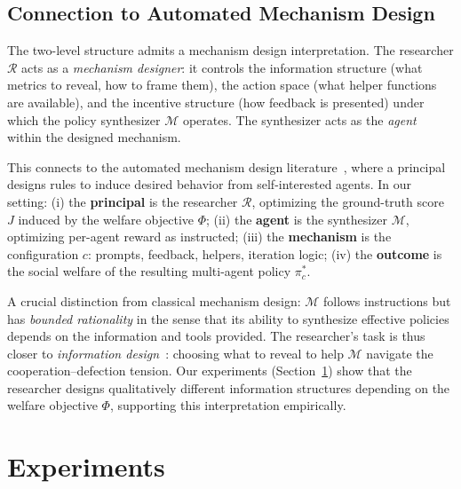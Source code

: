 \documentclass{article}
\newcommand{\cR}{\mathcal{R}}
\newcommand{\cM}{\mathcal{M}}
\begin{document}
\subsection{Connection to Automated Mechanism Design}
\label{sec:mechdesign}

The two-level structure admits a mechanism design interpretation. The researcher $\cR$ acts as a \emph{mechanism designer}: it controls the information structure (what metrics to reveal, how to frame them), the action space (what helper functions are available), and the incentive structure (how feedback is presented) under which the policy synthesizer $\cM$ operates. The synthesizer acts as the \emph{agent} within the designed mechanism.

This connects to the automated mechanism design literature~\cite{conitzer2002}, where a principal designs rules to induce desired behavior from self-interested agents. In our setting: (i) the \textbf{principal} is the researcher $\cR$, optimizing the ground-truth score $J$ induced by the welfare objective $\Phi$; (ii) the \textbf{agent} is the synthesizer $\cM$, optimizing per-agent reward as instructed; (iii) the \textbf{mechanism} is the configuration $c$: prompts, feedback, helpers, iteration logic; (iv) the \textbf{outcome} is the social welfare of the resulting multi-agent policy $\pi^*_c$.

A crucial distinction from classical mechanism design: $\cM$ follows instructions but has \emph{bounded rationality} in the sense that its ability to synthesize effective policies depends on the information and tools provided. The researcher's task is thus closer to \emph{information design}~\cite{kamenica2011}: choosing what to reveal to help $\cM$ navigate the cooperation--defection tension. Our experiments (Section~\ref{sec:experiments}) show that the researcher designs qualitatively different information structures depending on the welfare objective $\Phi$, supporting this interpretation empirically.

\section{Experiments}
\label{sec:experiments}

\end{document}
